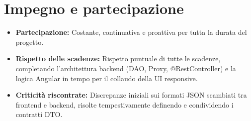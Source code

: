 \documentclass[11pt,a4paper]{article}
\begin{document}
\section{Impegno e partecipazione}
\begin{itemize}
    \item \textbf{Partecipazione:} Costante, continuativa e proattiva per tutta la durata del progetto.
    \item \textbf{Rispetto delle scadenze:} Rispetto puntuale di tutte le scadenze, completando l'architettura backend (DAO, Proxy, @RestController) e la logica Angular in tempo per il collaudo della UI responsive.
    \item \textbf{Criticità riscontrate:} Discrepanze iniziali sui formati JSON scambiati tra frontend e backend, risolte tempestivamente definendo e condividendo i contratti DTO.
\end{itemize}
\end{document}
